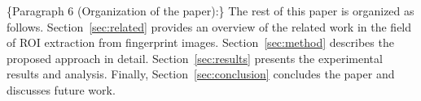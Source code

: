 \{Paragraph 6 (Organization of the paper):\}
The rest of this paper is organized as follows.
Section~\ref{sec:related} provides an overview of the related work in the field of ROI extraction from fingerprint images.
Section~\ref{sec:method} describes the proposed approach in detail.
Section~\ref{sec:results} presents the experimental results and analysis.
Finally, Section~\ref{sec:conclusion} concludes the paper and discusses future work.





